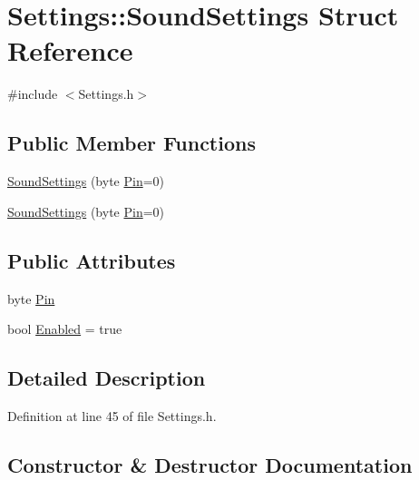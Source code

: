 \hypertarget{struct_settings_1_1_sound_settings}{}\section{Settings\+:\+:Sound\+Settings Struct Reference}
\label{struct_settings_1_1_sound_settings}


{\ttfamily \#include $<$Settings.\+h$>$}

\subsection*{Public Member Functions}
\begin{DoxyCompactItemize}
\item 
\hyperlink{struct_settings_1_1_sound_settings_a5c949e4522193fc759224e99372ad480}{Sound\+Settings} (byte \hyperlink{struct_settings_1_1_sound_settings_a64d5653b63e3a0e0b532d5b9da807d5f}{Pin}=0)
\item 
\hyperlink{struct_settings_1_1_sound_settings_a5c949e4522193fc759224e99372ad480}{Sound\+Settings} (byte \hyperlink{struct_settings_1_1_sound_settings_a64d5653b63e3a0e0b532d5b9da807d5f}{Pin}=0)
\end{DoxyCompactItemize}
\subsection*{Public Attributes}
\begin{DoxyCompactItemize}
\item 
byte \hyperlink{struct_settings_1_1_sound_settings_a64d5653b63e3a0e0b532d5b9da807d5f}{Pin}
\item 
bool \hyperlink{struct_settings_1_1_sound_settings_afea3193e9bde3ee58c9098ed9abcec4e}{Enabled} = true
\end{DoxyCompactItemize}


\subsection{Detailed Description}


Definition at line 45 of file Settings.\+h.



\subsection{Constructor \& Destructor Documentation}
\mbox{\label{struct_settings_1_1_sound_settings_a5c949e4522193fc759224e99372ad480}} 
